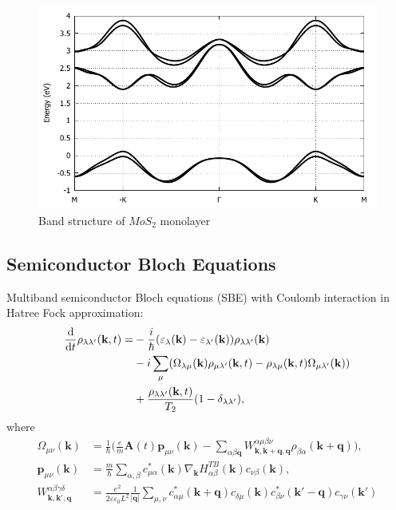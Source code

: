 \documentclass{beamer}
\begin{document}
	\begin{frame}
		\begin{figure}
			\caption{Band structure of $MoS_2$ monolayer
	\autocite{liu_three-band_2013}}	
			\includegraphics[width=0.75\linewidth]{images/BS.pdf}
		\end{figure}
	\end{frame}
	\subsection{Semiconductor Bloch Equations}
	\begin{frame}
	Multiband semiconductor Bloch equations (SBE) with Coulomb interaction in Hatree Fock approximation:
	\begin{align}
		\dv{ }{t}\rho_{\lambda \lambda'} (\textbf{k},t) = &-\frac{i}{\hbar} (\varepsilon_{\lambda}(\textbf{k}) -\varepsilon_{\lambda'}(\textbf{k}))\rho_{\lambda \lambda'} (\textbf{k})\nonumber\\
		& -i \sum_{\mu} (\Omega_{\lambda \mu}(\textbf{k})\rho_{\mu \lambda'}(\textbf{k},t) -\rho_{\lambda \mu}(\textbf{k},t)\Omega_{\mu \lambda'}(\textbf{k}))\\
		& + \frac{\rho_{\lambda \lambda'}(\textbf{k},t)}{T_2}(1-\delta_{\lambda\lambda'}),\nonumber
	\end{align}
	where
	\begin{align}
		\Omega_{\mu \nu}(\textbf{k}) &= \frac{1}{\hbar} \bigg(\frac{e}{m}\textbf{A}(t)\textbf{p}_{\mu \nu}(\textbf{k}) - \sum_{\alpha \beta \textbf{q}} W^{\alpha \mu \beta\nu}_{\textbf{k},\textbf{k}+\textbf{q},\textbf{q}}\rho_{\beta\alpha}(\textbf{k}+\textbf{q})\bigg),\\
		\textbf{p}_{\mu\nu}(\textbf{k}) &= \frac{m}{\hbar}\sum_{\alpha,\beta} c^*_{\mu\alpha}(\textbf{k})\nabla_{\textbf{k}}H^{TB}_{\alpha\beta}(\textbf{k})c_{\nu\beta}(\textbf{k}),\\
		W^{\alpha \beta \gamma \delta}_{\textbf{k}, \textbf{k}',\textbf{q}} &= \frac{e^2}{2\varepsilon\varepsilon_0 L^2} \frac{1}{|\textbf{q}|}
\sum_{\mu,\nu} c^*_{\alpha\mu}(\textbf{k}+\textbf{q})c_{\delta\mu}(\textbf{k}) c^*_{\beta \nu}(\textbf{k}'-\textbf{q}) c_{\gamma \nu}(\textbf{k}')
	\end{align}
	\end{frame}
\end{document}
